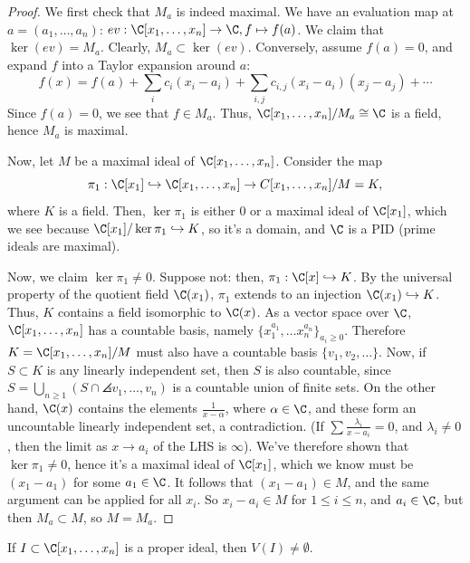 \begin{proof}
    We first check that $M_a$ is indeed maximal. We have an evaluation map at $a=(a_1,\dots,a_n)$: $ev:\C[x_1,\dots,x_n] \to \C,f \mapsto f(a)$. We claim that $\ker (ev)=M_a$. Clearly, $M_a \subset \ker (ev)$. Conversely, assume $f(a)=0$, and expand $f$ into a Taylor expansion around $a$:
    $$f(x)=f(a)+\sum_{i}c_i(x_i-a_i)+\sum_{i,j}c_{i,j}(x_i-a_i)(x_j-a_j)+\cdots$$
    Since $f(a)=0$, we see that $f \in M_a$. Thus, $\C[x_1,\dots,x_n]/M_a \cong \C$ is a field, hence $M_a$ is maximal.

    Now, let $M$ be a maximal ideal of $\C[x_1,\dots,x_n]$. Consider the map
    $$\pi _1:\C[x_1] \hookrightarrow \C[x_1,\dots,x_n] \to C[x_1,\dots,x_n]/M=K,$$
    where $K$ is a field. Then, $\ker \pi _1$ is either $0$ or a maximal ideal of $\C[x_1]$, which we see because $\C[x_1]/\ker \pi_1 \hookrightarrow K$, so it's a domain, and $\C$ is a PID (prime ideals are maximal).

    Now, we claim $\ker \pi_1 \ne 0$. Suppose not: then, $\pi_1 :\C[x] \hookrightarrow K$. By the universal property of the quotient field $\C(x_1)$, $\pi_1$ extends to an injection $\C(x_1) \hookrightarrow K$.
    Thus, $K$ contains a field isomorphic to $\C(x)$. As a vector space over $\C$, $\C[x_1,\dots,x_n]$ has a countable basis, namely $\{x_1^{a_1},\dots x_n^{a_n}\}_{a_i\geq0}$. Therefore $K = \C[x_1,\dots,x_n]/M$ must also have a countable basis $\{v_1,v_2,\dots\}$. Now, if $S \subset K$ is any linearly independent set, then $S$ is also countable, since $S = \bigcup_{n\geq1} (S \cap \angles{v_1,\dots,v_n})$ is a countable union of finite sets. On the other hand, $\C(x)$ contains the elements $\frac{1}{x-\alpha}$, where $\alpha \in \C$, and these form an uncountable linearly independent set, a contradiction. (If $\sum \frac{\lambda_i}{x-a_i}=0$, and $\lambda_i \neq 0$, then the limit as $x \to a_i$ of the LHS is $\infty$). We've therefore shown that $\ker \pi_1 \neq 0$, hence it's a maximal ideal of $\C[x_1]$, which we know must be $(x_1-a_1)$ for some $a_1 \in \C$. It follows that $(x_1-a_1) \in M$, and the same argument can be applied for all $x_i$. So $x_i - a_i \in M$ for $1 \leq i \leq n$, and $a_i \in \C$, but then $M_a \subset M$, so $M=M_a$.
\end{proof}

\begin{cor}
    If $I \subset \C[x_1,\dots,x_n]$ is a proper ideal, then $V(I) \neq \emptyset$.
\end{cor}

